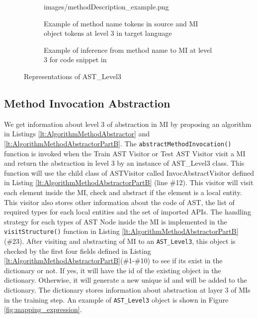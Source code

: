 \begin{figure}
\begin{subfigure}[t]{0.3\textwidth}
{        {images/methodDescription_example.png}}
        \caption{Example of method name tokens in source and MI object tokens at level 3 in target language}
        \label{fig:method_desc_example}
      \end{subfigure}
      \hfill
      \begin{subfigure}{0.3\textwidth}
        \caption{\label{fig:example_in} Example of inference from method name to MI at level 3 for code snippet in \cite{id:IntrinsicAndroidExample}}
      \end{subfigure}
\caption{
\label{fig:CombineImageOfASTLevel3}%
Representations of AST\_Level3}
\end{figure}

\subsection{Method Invocation Abstraction}

We get information about level 3 of abstraction in MI by proposing an algorithm in Listings \ref{lt:AlgorithmMethodAbstractor} and \ref{lt:AlgorithmMethodAbstractorPartB}. The \texttt{abstractMethodInvocation()} function is invoked when the Train AST Visitor or Test AST Visitor visit a MI and return the abstraction in level 3 by an instance of AST\_Level3 class. This function will use the child class of ASTVisitor called InvocAbstractVisitor defined in Listing \ref{lt:AlgorithmMethodAbstractorPartB} (line \#12). This visitor will visit each element inside the MI, check and abstract if the element is a local entity. This visitor also stores other information about the code of AST, the list of required types for each local entities and the set of imported APIs. The handling strategy for each types of AST Node inside the MI is implemented in the \texttt{visitStructure()} function in  Listing \ref{lt:AlgorithmMethodAbstractorPartB}(\#23). After visiting and abstracting of MI to an \texttt{AST\_Level3}, this object is checked by the first four fields defined in Listing \ref{lt:AlgorithmMethodAbstractorPartB}(\#1-\#10)  to see if its exist in the dictionary or not. If yes, it will have the id of the existing object in the dictionary. Otherwise, it will generate a new unique id and will be added to the dictionary. The dictionary stores information about abstraction at layer 3 of MIs in the training step. An example of  \texttt{AST\_Level3} object is shown in Figure \ref{fig:mapping_expression}.


